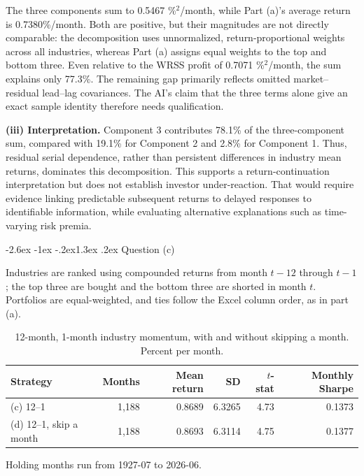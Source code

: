 \documentclass[11pt]{article}
\makeatletter
\renewcommand\section{\@startsection{section}{1}{0pt}%
  {-2.6ex \@plus -1ex \@minus -.2ex}{1.3ex \@plus .2ex}%
  {\normalfont\scshape\large\color{psink}}}   %
\makeatother
\begin{document}
The three components sum to 0.5467 \%$^2$/month, while Part (a)'s average return is 0.7380\%/month. Both are positive, but their magnitudes are not directly comparable: the decomposition uses unnormalized, return-proportional weights across all industries, whereas Part (a) assigns equal weights to the top and bottom three. Even relative to the WRSS profit of 0.7071 \%$^2$/month, the sum explains only 77.3\%. The remaining gap primarily reflects omitted market--residual lead--lag covariances. The AI's claim that the three terms alone give an exact sample identity therefore needs qualification.
 
\textbf{(iii) Interpretation.} Component 3 contributes 78.1\% of the three-component sum, compared with 19.1\% for Component 2 and 2.8\% for Component 1. Thus, residual serial dependence, rather than persistent differences in industry mean returns, dominates this decomposition. This supports a return-continuation interpretation but does not establish investor under-reaction. That would require evidence linking predictable subsequent returns to delayed responses to identifiable information, while evaluating alternative explanations such as time-varying risk premia.

\section{Question (c)}

Industries are ranked using compounded returns from month $t-12$ through $t-1$; the top three are bought and the bottom three are shorted in month $t$. Portfolios are equal-weighted, and ties follow the Excel column order, as in part (a).

\begin{table}[H]
\centering
\caption{12-month, 1-month industry momentum, with and without skipping a month. Percent per month.}
\small
\begin{tabular}{lrrrrr}
\toprule
Strategy & Months & Mean return & SD & $t$-stat & Monthly Sharpe \\
\midrule
(c) 12--1 & 1,188 & 0.8689 & 6.3265 & 4.73 & 0.1373 \\
(d) 12--1, skip a month & 1,188 & 0.8693 & 6.3114 & 4.75 & 0.1377 \\
\bottomrule
\end{tabular}
\vspace{2pt}\begin{minipage}{0.85\textwidth}\footnotesize
Holding months run from 1927-07 to 2026-06.
\end{minipage}
\end{table}
\end{document}

